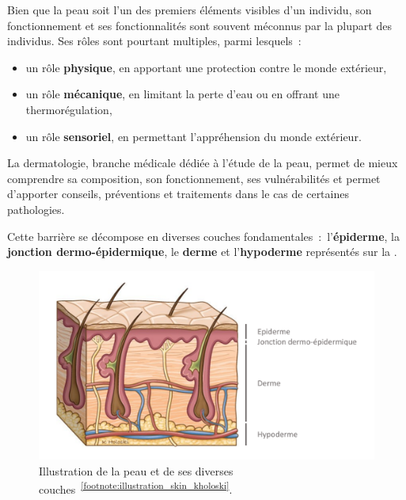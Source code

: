 Bien que la peau soit l'un des premiers éléments visibles d'un individu, son fonctionnement et ses fonctionnalités sont souvent méconnus par la plupart des individus. Ses rôles sont pourtant multiples, parmi lesquels~:
\begin{itemize}
    \item un rôle \textbf{physique}, en apportant une protection contre le monde extérieur,
    \item un rôle \textbf{mécanique}, en limitant la perte d’eau ou en offrant une thermorégulation,
    \item un rôle \textbf{sensoriel}, en permettant l'appréhension du monde extérieur.
\end{itemize}\par

La dermatologie, branche médicale dédiée à l’étude de la peau, permet de mieux comprendre sa composition, son fonctionnement, ses vulnérabilités et permet d’apporter conseils, préventions et traitements dans le cas de certaines pathologies.\par

Cette barrière se décompose en diverses couches fondamentales~:~l’\textbf{épiderme}, la \textbf{jonction dermo-épidermique}, le \textbf{derme} et l’\textbf{hypoderme} représentés sur la .\par
\begin{figure}[H]
    \centering
    \includegraphics[width=0.75\linewidth]{contents/chapter_1/resources/illustration_skin_kholoski.pdf}
    \caption{Illustration de la peau et de ses diverses couches~\textsuperscript{\ref{footnote:illustration_skin_kholoski}}.}
    \label{fig:illustration_skin_kholoski}
\end{figure}\par 

\addtocounter{footnote}{1}

